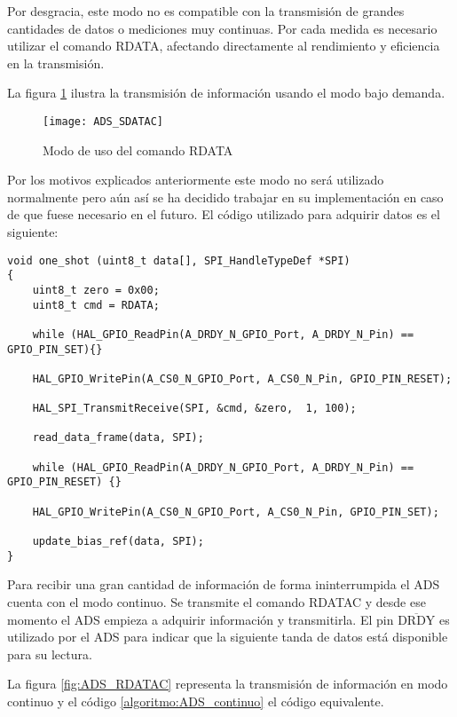 Por desgracia, este modo no es compatible con la transmisión de grandes cantidades de datos o mediciones muy continuas. Por cada medida es necesario utilizar el comando \textsc{RDATA}, afectando directamente al rendimiento y eficiencia en la transmisión.

La figura \ref{fig:ADS_SDATAC} ilustra la transmisión de información usando el modo bajo demanda.

\begin{figure} [H]
    \centering
    \texttt{[image: ADS\_SDATAC]}
    \caption{Modo de uso del comando \textsc{RDATA}}
    \label{fig:ADS_SDATAC}
\end{figure}

Por los motivos explicados anteriormente este modo no será utilizado normalmente pero aún así se ha decidido trabajar en su implementación en caso de que fuese necesario en el futuro. El código utilizado para adquirir datos es el siguiente:

\begin{lstlisting}[label=algoritmo:ADS_oneshot,style = STM-code,frame=single,caption=Lectura de datos en modo \textit{one-shot}]
void one_shot (uint8_t data[], SPI_HandleTypeDef *SPI)
{
	uint8_t zero = 0x00;
	uint8_t cmd = RDATA;
			
	while (HAL_GPIO_ReadPin(A_DRDY_N_GPIO_Port, A_DRDY_N_Pin) == GPIO_PIN_SET){}

	HAL_GPIO_WritePin(A_CS0_N_GPIO_Port, A_CS0_N_Pin, GPIO_PIN_RESET);
	
	HAL_SPI_TransmitReceive(SPI, &cmd, &zero,  1, 100);

	read_data_frame(data, SPI);
			
	while (HAL_GPIO_ReadPin(A_DRDY_N_GPIO_Port, A_DRDY_N_Pin) == GPIO_PIN_RESET) {}			
				
	HAL_GPIO_WritePin(A_CS0_N_GPIO_Port, A_CS0_N_Pin, GPIO_PIN_SET);

	update_bias_ref(data, SPI);
}
\end{lstlisting}

Para recibir una gran cantidad de información de forma ininterrumpida el ADS cuenta con el modo continuo. Se transmite el comando \textsc{RDATAC} y desde ese momento el ADS empieza a adquirir información y transmitirla. El pin $\overline{\text{DRDY}}$ es utilizado por el ADS para indicar que la siguiente tanda de datos está disponible para su lectura. 

La figura \ref{fig:ADS_RDATAC} representa la transmisión de información en modo continuo y el código \ref{algoritmo:ADS_continuo} el código equivalente.

